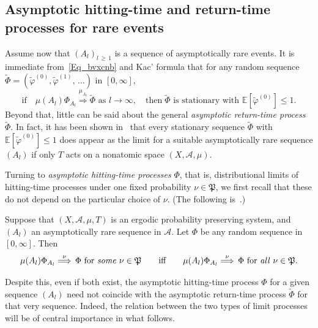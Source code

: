 \documentclass[10pt]{amsart}
\theoremstyle{definition}\newtheorem{defi}[theo]{Definition}\newtheorem{rema}[theo]{Remark}\newtheorem{exam}[theo]{Example}\newtheorem{exem}[theo]{Example}\newtheorem{nota}[theo]{Notation}
\newcommand{\clA}{\mathcal{A}}
\newcommand{\frkP}{\mathfrak{P}}
\newcommand{\bbE}{\mathbb{E}}
\begin{document}
\subsection{Asymptotic hitting-time and return-time processes for rare events}
Assume now that $(A_{l})_{l\,\geq\,1}$ is a sequence of asymptotically rare events. It is immediate from~\eqref{Eq_bvxcnb} and Kac' formula that for any random sequence $\widetilde{\Phi}=(\widetilde{\varphi}^{(0)},\widetilde {\varphi}^{(1)},\,\ldots)$ in $[0,\infty]$,
\begin{equation}\label{Eq_BasicPropsAsyRetProc}
\text{if}\quad\mu(A_{l})\Phi_{A_{l}}\overset{\mu_{A_{l}}}{\Longrightarrow }\widetilde{\Phi}\text{ as }l\rightarrow\infty,\quad \text{then}\;\widetilde{\Phi}\text{ is stationary with }\bbE\left[\widetilde{\varphi}^{(0)}\right]\leq1. 
\end{equation}
Beyond that, little can be said about the general \emph{asymptotic return-time process} $\widetilde{\Phi}$. In fact, it has been shown in~\cite{Z11} that every stationary sequence $\widetilde{\Phi}$ with $\bbE[\widetilde {\varphi}^{(0)}]\leq1$ does appear as the limit for a suitable asymptotically rare sequence $(A_{l})$ if only $T$ acts on a nonatomic space $(X,\clA,\mu)$.

Turning to \emph{asymptotic hitting-time processes} $\Phi$, that is, distributional limits of hitting-time processes under one fixed probability $\nu\in\frkP$, we first recall that these do not depend on the particular choice of $\nu$. (The following is~\cite[Corollary~6]{Z7}.)

\begin{prop}\label{P_SDCforHittiPs}
Suppose that $(X,\clA,\mu,T)$ is an ergodic probability preserving system, and $(A_{l})$ an asymptotically rare sequence in $\clA$. Let $\Phi$ be any random sequence in $[0,\infty]$. Then
\begin{equation}
\mu(A_{l})\Phi_{A_{l}}\overset{\nu}{\Longrightarrow}\,\Phi\text{ for
\emph{some} }\nu\in\frkP\qquad\text{iff}\qquad\mu(A_{l})\Phi_{A_{l} }\overset{\nu}{\Longrightarrow}\,\Phi\text{ for \emph{all} }\nu\in
\frkP.
\end{equation}
\end{prop}

Despite this, even if both exist, the asymptotic hitting-time process $\Phi$ for a given sequence $(A_{l})$ need not coincide with the asymptotic return-time process $\widetilde{\Phi}$ for that very sequence. Indeed, the relation between the two types of limit processes will be of central importance in what follows.
\end{document}
